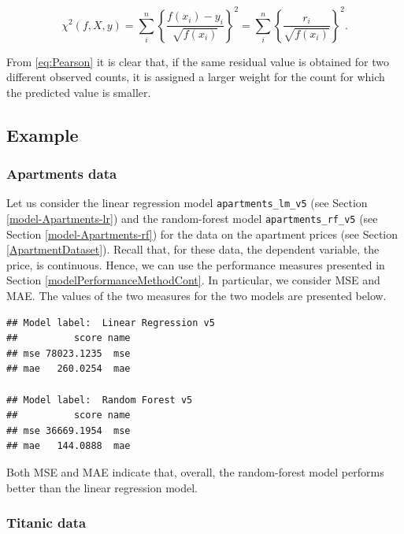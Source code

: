 \documentclass[12pt,]{krantz}
\begin{document}
\begin{equation}
\chi^2(f,X,y) = \sum_{i}^{n} \left\{\frac{f(x_i) - y_i}{\sqrt{f(x_i)}}\right\}^2 = \sum_{i}^{n} \left\{\frac{r_i}{\sqrt{f(x_i)}}\right\}^2.
\label{eq:Pearson}
\end{equation}

From \eqref{eq:Pearson} it is clear that, if the same residual value is obtained for two different observed counts, it is assigned a larger weight for the count for which the predicted value is smaller.

\hypertarget{example}{%
\subsection{Example}\label{example}}

\hypertarget{modelPerformanceApartments}{%
\subsubsection{Apartments data}\label{modelPerformanceApartments}}

Let us consider the linear regression model \texttt{apartments\_lm\_v5} (see Section \ref{model-Apartments-lr}) and the random-forest model \texttt{apartments\_rf\_v5} (see Section \ref{model-Apartments-rf}) for the data on the apartment prices (see Section \ref{ApartmentDataset}). Recall that, for these data, the dependent variable, the price, is continuous. Hence, we can use the performance measures presented in Section \ref{modelPerformanceMethodCont}. In particular, we consider MSE and MAE. The values of the two measures for the two models are presented below.

\begin{verbatim}
## Model label:  Linear Regression v5 
##          score name
## mse 78023.1235  mse
## mae   260.0254  mae

## Model label:  Random Forest v5 
##          score name
## mse 36669.1954  mse
## mae   144.0888  mae
\end{verbatim}

Both MSE and MAE indicate that, overall, the random-forest model performs better than the linear regression model.

\hypertarget{modelPerformanceTitanic}{%
\subsubsection{Titanic data}\label{modelPerformanceTitanic}}
\end{document}

